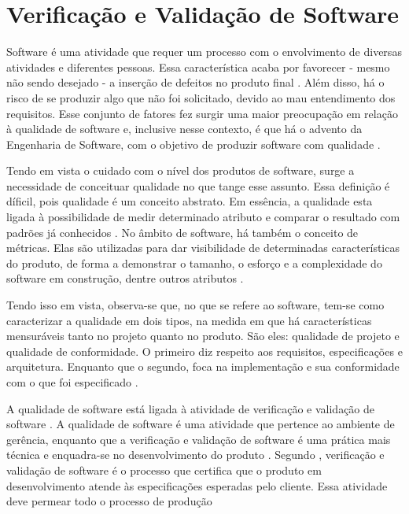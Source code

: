 \section{Verificação e Validação de Software}
Software é uma atividade que requer um processo com o envolvimento de diversas
atividades e diferentes pessoas. Essa característica acaba por favorecer - mesmo
não sendo desejado - a inserção de defeitos no produto final \cite{trodo2009}.
Além disso, há o risco de se produzir algo que não foi solicitado, devido ao
mau entendimento dos requisitos\cite{barbosaEtAl2009}. Esse conjunto de
fatores fez surgir uma maior preocupação em relação à qualidade de software e,
inclusive nesse contexto, é que há o advento da Engenharia de Software, com o
objetivo de produzir software com qualidade \cite{buenoCampelo2013}.
\par
\indent Tendo em vista o cuidado com o nível dos produtos de software, surge a
necessidade de conceituar qualidade no que tange esse assunto. Essa definição é
díficil, pois qualidade é um conceito abstrato. Em essência, a qualidade esta
ligada à possibilidade de medir determinado atributo e comparar o resultado com
padrões já conhecidos \cite{buenoCampelo2013}. No âmbito de software, há também
o conceito de métricas. Elas são utilizadas para dar visibilidade de
determinadas características do produto, de forma a demonstrar o tamanho, o
esforço e a complexidade do software em construção, dentre outros atributos
\cite{abreu2011}.
\par
\indent Tendo isso em vista, observa-se que, no que se refere ao software,
tem-se como caracterizar a qualidade em dois tipos, na medida em que há
características mensuráveis tanto no projeto quanto no produto. São eles:
qualidade de projeto e qualidade de conformidade. O primeiro diz respeito aos
requisitos, especificações e arquitetura. Enquanto que o segundo, foca na
implementação e sua conformidade com o que foi especificado
\cite{buenoCampelo2013}.
\par
\indent A qualidade de software está ligada à atividade de verificação e
validação de software \cite{buenoCampelo2013}. A qualidade de software é uma
atividade que pertence ao ambiente de gerência, enquanto que a verificação e
validação de software é uma prática mais técnica e enquadra-se no
desenvolvimento do produto \cite{buenoCampelo2013}. Segundo
, verificação e validação de software é o processo
que certifica que o produto em desenvolvimento atende às especificações
esperadas pelo cliente. Essa atividade deve permear todo o processo de produção
